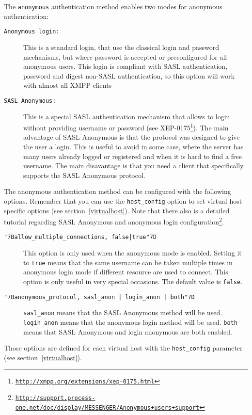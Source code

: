 \documentclass[a4paper,10pt]{book}
\newcommand{\bracehack}{\def\{{\char"7B}\def\}{\char"7D}}
\newcommand{\titem}[1]{\item[\bracehack\texttt{#1}]}
\newcommand{\term}[1]{\texttt{#1}}
\gdef\footahref#1#2{#2\footnote{\href{#1}{\texttt{#1}}}}
\newcommand{\txepref}[2]{\footahref{http://xmpp.org/extensions/xep-#1.html}{#2}}
\newcommand{\xepref}[1]{\txepref{#1}{XEP-#1}}
\begin{document}
The \term{anonymous} authentication method enables two modes for anonymous authentication:
\begin{description}
\titem{Anonymous login:} This is a standard login, that use the
  classical login and password mechanisms, but where password is
  accepted or preconfigured for all anonymous users. This login is
  compliant with SASL authentication, password and digest non-SASL
  authentication, so this option will work with almost all XMPP
  clients

\titem{SASL Anonymous:} This is a special SASL authentication
  mechanism that allows to login without providing username or
  password (see \xepref{0175}).  The main advantage of SASL Anonymous
  is that the protocol was designed to give the user a login. This is
  useful to avoid in some case, where the server has many users
  already logged or registered and when it is hard to find a free
  username. The main disavantage is that you need a client that
  specifically supports the SASL Anonymous protocol.
\end{description}

The anonymous authentication method can be configured with the following
options. Remember that you can use the \term{host\_config} option to set virtual
host specific options (see section~\ref{virtualhost}). Note that there also
is a detailed tutorial regarding \footahref{http://support.process-one.net/doc/display/MESSENGER/Anonymous+users+support}{SASL
Anonymous and anonymous login configuration}.

\begin{description}
\titem{\{allow\_multiple\_connections, false|true\}} This option is only used
  when the anonymous mode is
  enabled. Setting it to \term{true} means that the same username can be taken
  multiple times in anonymous login mode if different resource are used to
  connect. This option is only useful in very special occasions. The default
  value is \term{false}.
\titem{\{anonymous\_protocol, sasl\_anon | login\_anon | both\}} 
  \term{sasl\_anon} means
  that the SASL Anonymous method will be used. \term{login\_anon} means that the
  anonymous login method will be used. \term{both} means that SASL Anonymous and
  login anonymous are both enabled.
\end{description}

Those options are defined for each virtual host with the \term{host\_config}
parameter (see section~\ref{virtualhost}).
\end{document}
